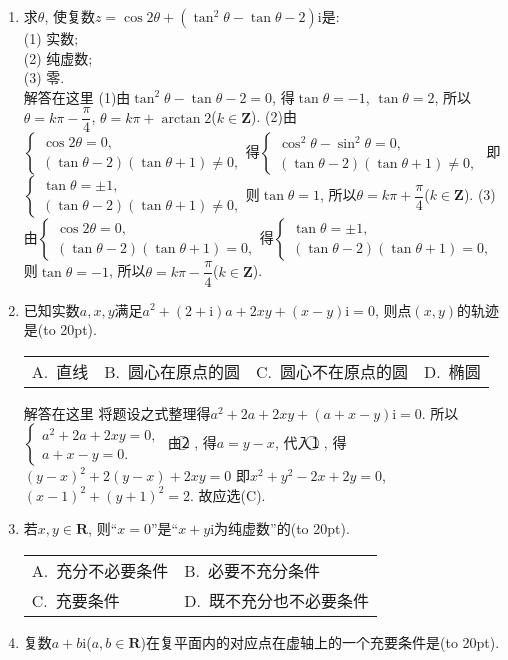 \documentclass[10pt,a4paper]{article}
\newcommand{\bracket}[1]{(\hbox to #1pt{})}
\newcommand{\twoch}[4]{\par\begin{tabular}{p{.46\textwidth}p{.46\textwidth}}
A.~#1& B.~#2\\
C.~#3& D.~#4
\end{tabular}}
\newcommand{\fourch}[4]{\par\begin{tabular}{p{.23\textwidth}p{.23\textwidth}p{.23\textwidth}p{.23\textwidth}}
A.~#1 &B.~#2& C.~#3& D.~#4
\end{tabular}}
\begin{document}
\begin{enumerate}[1.]


\item 求$\theta$, 使复数$z=\cos 2\theta +(\tan ^2\theta -\tan \theta -2)\mathrm{i}$是:\\
(1) 实数;\\
(2) 纯虚数;\\ 
(3) 零.\\
解答在这里  (1)由$\tan ^2\theta -\tan \theta -2=0$, 得$\tan \theta =-1$, $\tan \theta =2$,
所以$\theta =k\pi -\dfrac{\pi }4$, $\theta =k\pi +\arctan 2$($k\in \mathbf{Z}$).
(2)由$\begin{cases} \cos 2\theta =0, \\ (\tan \theta -2)(\tan \theta +1)\ne 0, \end{cases}$得$\begin{cases} \cos ^2\theta -\sin ^2\theta =0, \\ (\tan \theta -2)(\tan \theta +1)\ne 0, \end{cases}$
即$\begin{cases} \tan \theta =\pm 1, \\ (\tan \theta -2)(\tan \theta +1)\ne 0, \end{cases}$则$\tan \theta =1$, 所以$\theta =k\pi +\dfrac{\pi }4$($k\in \mathbf{Z}$).
(3)由$\begin{cases} \cos 2\theta =0, \\ (\tan \theta -2)(\tan \theta +1)=0, \end{cases}$得$\begin{cases} \tan \theta =\pm 1, \\ (\tan \theta -2)(\tan \theta +1)=0, \end{cases}$
则$\tan \theta =-1$, 所以$\theta =k\pi -\dfrac{\pi }4$($k\in \mathbf{Z}$).
\item 已知实数$a,x,y$满足$a^2+(2+\mathrm{i})a+2xy+(x-y)\mathrm{i}=0$, 则点$(x,y)$的轨迹是\bracket{20}.
\fourch{直线}{圆心在原点的圆}{圆心不在原点的圆}{椭圆}
解答在这里  将题设之式整理得$a^2+2a+2xy+(a+x-y)\mathrm{i}=0$.
所以$\begin{cases} a^2+2a+2xy=0,  \\ a+x-y=0. \end{cases}$
由\textcircled{2} , 得$a=y-x$, 代入\textcircled{1} , 得$(y-x)^2+2(y-x)+2xy=0$
即$x^2+y^2-2x+2y=0$, $(x-1)^2+(y+1)^2=2$.
故应选(C).
\item 若$x,y\in \mathbf{R}$, 则``$x=0$''是``$x+y\mathrm{i}$为纯虚数''的\bracket{20}.
\twoch{充分不必要条件}{必要不充分条件}{充要条件}{既不充分也不必要条件}
\item 复数$a+b\mathrm{i}$($a,b\in \mathbf{R}$)在复平面内的对应点在虚轴上的一个充要条件是\bracket{20}.

\end{enumerate}
\end{document}
